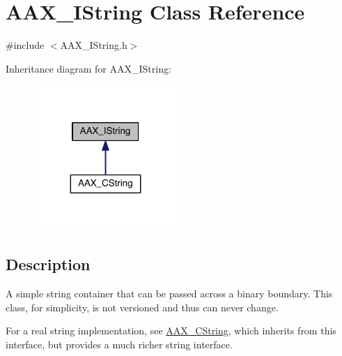 \hypertarget{a00113}{}\section{A\+A\+X\+\_\+\+I\+String Class Reference}
\label{a00113}


{\ttfamily \#include $<$A\+A\+X\+\_\+\+I\+String.\+h$>$}



Inheritance diagram for A\+A\+X\+\_\+\+I\+String\+:
\nopagebreak
\begin{figure}[H]
\begin{center}
\leavevmode
\includegraphics[width=155pt]{a00659}
\end{center}
\end{figure}


\subsection{Description}
A simple string container that can be passed across a binary boundary. This class, for simplicity, is not versioned and thus can never change. 

For a real string implementation, see \hyperlink{a00042}{A\+A\+X\+\_\+\+C\+String}, which inherits from this interface, but provides a much richer string interface.


